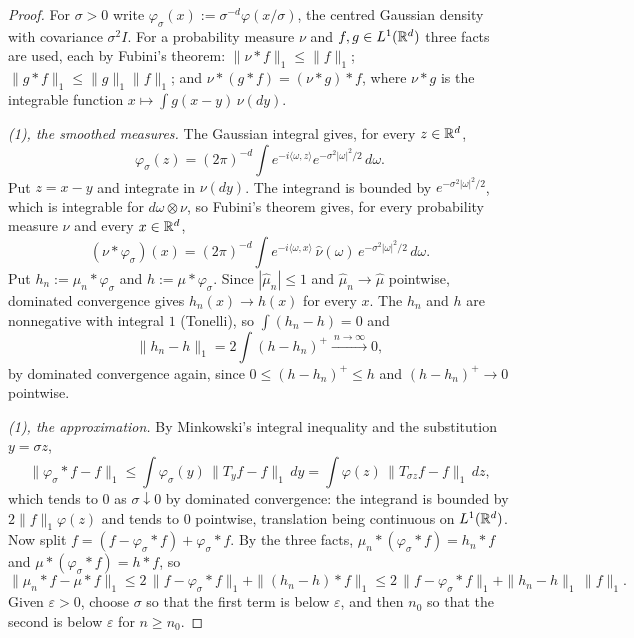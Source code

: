 \begin{proof}
For $\sigma > 0$ write $\varphi_\sigma(x) := \sigma^{-d}\varphi(x/\sigma)$, the centred Gaussian density
with covariance $\sigma^2I$. For a probability measure $\nu$ and $f, g \in L^1(\mathbb{R}^d)$ three facts are
used, each by Fubini's theorem: $\|\nu * f\|_1 \le \|f\|_1$; $\|g * f\|_1 \le \|g\|_1\|f\|_1$; and
$\nu * (g * f) = (\nu * g) * f$, where $\nu * g$ is the integrable function
$x \mapsto \int g(x - y)\,\nu(dy)$.

\emph{(1), the smoothed measures.} The Gaussian integral gives, for every $z \in \mathbb{R}^d$,
\[
  \varphi_\sigma(z) = (2\pi)^{-d}\int e^{-i\langle\omega,z\rangle}e^{-\sigma^2|\omega|^2/2}\,d\omega .
\]
Put $z = x - y$ and integrate in $\nu(dy)$. The integrand is bounded by $e^{-\sigma^2|\omega|^2/2}$,
which is integrable for $d\omega \otimes \nu$, so Fubini's theorem gives, for every probability
measure $\nu$ and every $x \in \mathbb{R}^d$,
\[
  (\nu * \varphi_\sigma)(x) = (2\pi)^{-d}\int e^{-i\langle\omega,x\rangle}\,\widehat\nu(\omega)\,
  e^{-\sigma^2|\omega|^2/2}\,d\omega .
\]
Put $h_n := \mu_n * \varphi_\sigma$ and $h := \mu * \varphi_\sigma$. Since $|\widehat\mu_n| \le 1$ and
$\widehat\mu_n \to \widehat\mu$ pointwise, dominated convergence gives $h_n(x) \to h(x)$ for every
$x$. The $h_n$ and $h$ are nonnegative with integral $1$ (Tonelli), so $\int(h_n - h) = 0$ and
\[
  \|h_n - h\|_1 = 2\int(h - h_n)^+ \xrightarrow{\ n \to \infty\ } 0 ,
\]
by dominated convergence again, since $0 \le (h - h_n)^+ \le h$ and $(h - h_n)^+ \to 0$ pointwise.

\emph{(1), the approximation.} By Minkowski's integral inequality and the substitution $y = \sigma z$,
\[
  \|\varphi_\sigma * f - f\|_1 \le \int\varphi_\sigma(y)\,\|T_yf - f\|_1\,dy
  = \int\varphi(z)\,\|T_{\sigma z}f - f\|_1\,dz ,
\]
which tends to $0$ as $\sigma \downarrow 0$ by dominated convergence: the integrand is bounded by
$2\|f\|_1\varphi(z)$ and tends to $0$ pointwise, translation being continuous on $L^1(\mathbb{R}^d)$. Now
split $f = (f - \varphi_\sigma * f) + \varphi_\sigma * f$. By the three facts,
$\mu_n * (\varphi_\sigma * f) = h_n * f$ and $\mu * (\varphi_\sigma * f) = h * f$, so
\[
  \|\mu_n * f - \mu * f\|_1 \le 2\,\|f - \varphi_\sigma * f\|_1 + \|(h_n - h) * f\|_1
  \le 2\,\|f - \varphi_\sigma * f\|_1 + \|h_n - h\|_1\,\|f\|_1 .
\]
Given $\varepsilon > 0$, choose $\sigma$ so that the first term is below $\varepsilon$, and then $n_0$ so
that the second is below $\varepsilon$ for $n \ge n_0$.


\end{proof}
